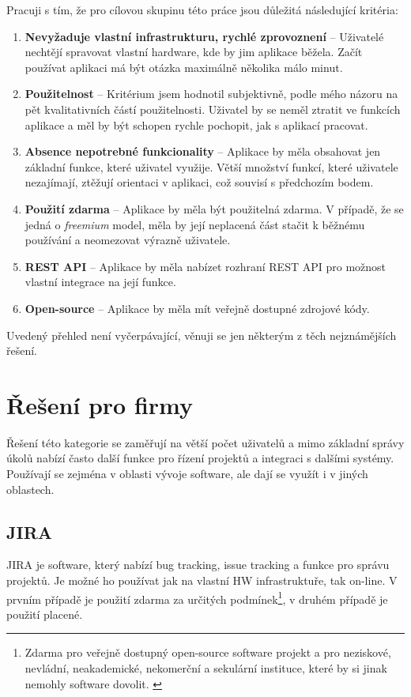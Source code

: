 \documentclass[thesis=B,czech]{FITthesis}[2012/06/26]
\newcommand{\crita}{Nevyžaduje vlastní infrastrukturu, rychlé zprovoznení}
\newcommand{\critb}{Použitelnost}
\newcommand{\critc}{Absence nepotrebné funkcionality}
\newcommand{\critd}{Použití zdarma}
\newcommand{\critf}{REST API}
\newcommand{\critg}{Open-source}
\begin{document}
	Pracuji s tím, že pro cílovou skupinu této práce jsou důležitá následující kritéria:
	\begin{enumerate}
		\item \textbf{\crita} -- Uživatelé nechtějí spravovat vlastní hardware, kde by jim aplikace běžela. Začít používat aplikaci má být otázka maximálně několika málo minut.
		\item \textbf{\critb} -- Kritérium jsem hodnotil subjektivně, podle mého názoru na pět kvalitativních částí použitelnosti\cite{usability}. Uživatel by se neměl ztratit ve funkcích aplikace a měl by být schopen rychle pochopit, jak s aplikací pracovat. 
		\item \textbf{\critc} -- 	Aplikace by měla obsahovat jen základní funkce, které uživatel využije. Větší množství funkcí, které uživatele nezajímají, ztěžují orientaci v aplikaci, což souvisí s předchozím bodem.
		\item \textbf{\critd} -- Aplikace by měla být použitelná zdarma. V případě, že se jedná o \textit{freemium} model, měla by její neplacená část stačit k běžnému používání a neomezovat výrazně uživatele.
		\item \textbf{\critf} -- Aplikace by měla nabízet rozhraní REST API pro možnost vlastní integrace na její funkce.
		\item \textbf{\critg} -- Aplikace by měla mít veřejně dostupné zdrojové kódy.
	\end{enumerate}
	Uvedený přehled není vyčerpávající, věnuji se jen některým z těch nejznámějších řešení. 

	\section{Řešení pro firmy}
		\label{sec:solutions-companies}
		Řešení této kategorie se zaměřují na větší počet uživatelů a mimo základní správy úkolů nabízí často další funkce pro řízení projektů a integraci s dalšími systémy. Používají se zejména v oblasti vývoje software, ale dají se využít i v jiných oblastech.
		
		\subsection{JIRA}
			JIRA \cite{jira} je software, který nabízí bug tracking, issue tracking a funkce pro správu projektů. Je možné ho používat jak na vlastní HW infrastruktuře, tak on-line. V prvním případě je použití zdarma za určitých podmínek\footnote{Zdarma pro veřejně dostupný open-source software projekt\cite{jira-lic-opensource} a pro neziskové, nevládní, neakademické, nekomerční a sekulární instituce, které by si jinak nemohly software dovolit. \cite{jira-lic-nonprofit}}, v druhém případě je použití placené. 
			
\end{document}
